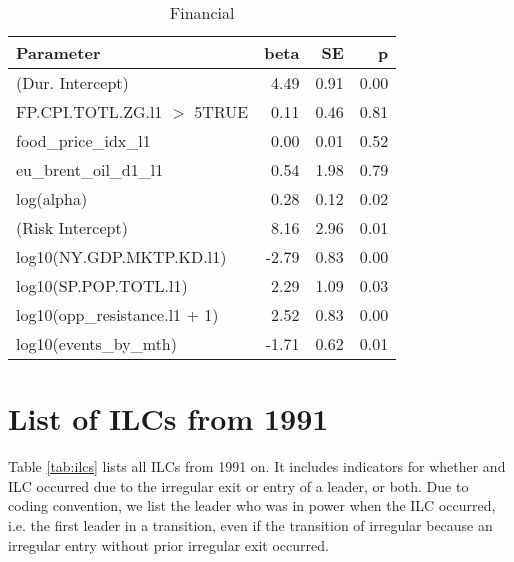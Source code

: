 \documentclass[pdftex,11pt]{article}
\begin{document}
\begin{table*}[ht]
\centering
\begin{tabular}{lrrr}
  \hline
Parameter & beta & SE & p \\ 
  \hline
(Dur. Intercept) & 4.49 & 0.91 & 0.00 \\ 
  FP.CPI.TOTL.ZG.l1 $>$ 5TRUE & 0.11 & 0.46 & 0.81 \\ 
  food\_price\_idx\_l1 & 0.00 & 0.01 & 0.52 \\ 
  eu\_brent\_oil\_d1\_l1 & 0.54 & 1.98 & 0.79 \\ 
  log(alpha) & 0.28 & 0.12 & 0.02 \\ 
  (Risk Intercept) & 8.16 & 2.96 & 0.01 \\ 
  log10(NY.GDP.MKTP.KD.l1) & -2.79 & 0.83 & 0.00 \\ 
  log10(SP.POP.TOTL.l1) & 2.29 & 1.09 & 0.03 \\ 
  log10(opp\_resistance.l1 + 1) & 2.52 & 0.83 & 0.00 \\ 
  log10(events\_by\_mth) & -1.71 & 0.62 & 0.01 \\ 
   \hline
\end{tabular}
\caption{Financial} 
\label{model7}
\end{table*}


\section{List of ILCs from 1991}

Table \ref{tab:ilcs} lists all ILCs from 1991 on. It includes indicators for whether and ILC occurred due to the irregular exit or entry of a leader, or both. Due to coding convention, we list the leader who was in power when the ILC occurred, i.e. the first leader in a transition, even if the transition of irregular because an irregular entry without prior irregular exit occurred.
\end{document}
